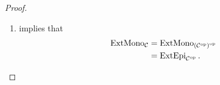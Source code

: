 \documentclass{book}
\begin{document}
\begin{proof}
\begin{enumerate}
\begin{itemize}
\begin{itemize}
				\end{itemize}
				Thus $f \in \ExtMono_{\op{\MC}}(A, B)$. Since $f \in \ExtEpi_{\MC}(B, A)$ is arbitrary, we have that for each $f \in \ExtMono_{\op{\MC}}(A, B)$, $f \in \ExtEpi_{\MC}(B, A)$. Hence $\ExtMono_{\op{\MC}}(A, B) \subset \ExtEpi_{\MC}(B, A)$.
			\end{itemize}
			Since $\ExtMono_{\op{\MC}}(A, B) \subset \ExtEpi_{\MC}(B, A)$ and $\ExtMono_{\op{\MC}}(A, B) \subset \ExtEpi_{\MC}(B, A)$, we have that $\ExtMono_{\op{\MC}}(A, B) = \ExtEpi_{\MC}(B, A)$. Since $A,B \in \Obj(\MC)$ are arbitrary, we have that for each $A,B \in \Obj(\MC)$, $\ExtMono_{\op{\MC}}(A, B) = \ExtEpi_{\MC}(B, A)$. Therefore 
			\begin{align*}
				\ExtMono_{\op{\MC}}
				& = \bigcup\limits_{(A,B) \in \Obj(\op{\MC})^2} \ExtMono_{\op{\MC}}(A,B) \\
				& = \bigcup\limits_{(A,B) \in \Obj(\MC)^2} \ExtMono_{\op{\MC}}(A,B) \\
				& = \bigcup\limits_{(B,A) \in \Obj(\MC)^2} \ExtEpi_{\MC}(B,A) \\
				& = \ExtEpi_{\MC}.
			\end{align*}
			\item {} implies that 
			\begin{align*}
				\operatorname{ExtMono}_{\mathcal{C}}
				& = \operatorname{ExtMono}_{{({\mathcal{C}}^{\text{op}})}^{\text{op}}} \\
				& = \operatorname{ExtEpi}_{{\mathcal{C}}^{\text{op}}}.
			\end{align*}
		\end{enumerate}
	\end{proof}
	
	
	
	
	
	
	
	
	
	
	
	
	
	
	
	
	
	
	
	
	
	
	
	
	
	
	
	
	
	
	
	
	
	
	
	
	
	
	
	
	
	
	
\end{document}
